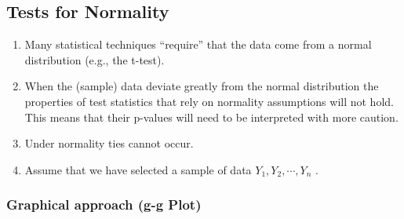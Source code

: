 \subsection{Tests for Normality}

\begin{enumerate}
    \item Many statistical techniques “require” that the data come from a normal distribution (e.g., the t-test). 
    \hfill \cite{statistics/book/Statistics-for-Data-Scientists/Maurits-Kaptein}

    \item When the (sample) data deviate greatly from the normal distribution the properties of test statistics that rely on normality assumptions will not hold. 
    This means that their p-values will need to be interpreted with more caution. 
    \hfill \cite{statistics/book/Statistics-for-Data-Scientists/Maurits-Kaptein}

    \item Under normality ties cannot occur. 
    \hfill \cite{statistics/book/Statistics-for-Data-Scientists/Maurits-Kaptein}

    \item Assume that we have selected a sample of data $Y_1 , Y_2, \cdots , Y_n$ .
    \hfill \cite{statistics/book/Statistics-for-Data-Scientists/Maurits-Kaptein}
\end{enumerate}

\subsubsection{Graphical approach (g-g Plot)}

